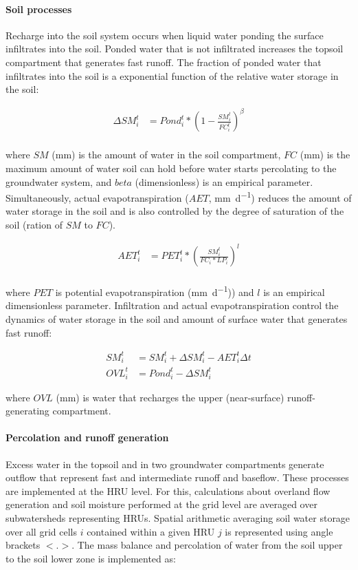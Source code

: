 \paragraph{Soil processes}  
Recharge into the soil system occurs when liquid water ponding the surface infiltrates into the soil. Ponded water that is not infiltrated increases the topsoil compartment that generates fast runoff. The fraction of ponded water that infiltrates into the soil is a exponential function of the relative water storage in the soil: 

\begin{align}
\Delta SM_i^t &= Pond_i^t * \left(1 - \frac{SM_i^t}{FC_i^t} \right)^\beta \\
\end{align} 

\noindent where $SM$ (\si{\milli\metre}) is the amount of water in the soil compartment, $FC$ (\si{\milli\metre}) is the maximum amount of water soil can hold before water starts percolating to the groundwater system, and $beta$ (dimensionless) is an empirical parameter. Simultaneously, actual evapotranspiration ($AET$, \si{\milli\metre\per\day}) reduces the amount of water storage in the soil and is also controlled by the degree of saturation of the soil (ration of $SM$ to $FC$). 

\begin{align}
AET_i^t &= PET_i^t * \left(\frac{SM_i^t}{FC_i * LP_i} \right)^l	 \\
\end{align} 

\noindent where $PET$ is potential evapotranspiration (\si{\milli\metre\per\day})) and $l$ is an empirical dimensionless parameter. Infiltration and actual evapotranspiration control the dynamics of water storage in the soil and amount of surface water that generates fast runoff:

\begin{align}
SM_i^t &= SM_i^{t} + \Delta SM_i^t - AET_i^t \Delta t\\
OVL_i^t &= Pond_i^t - \Delta SM_i^t
\end{align}

\noindent where $OVL$ (\si{\milli\metre}) is water that recharges the upper (near-surface) runoff-generating compartment.

\paragraph{Percolation and runoff generation}
Excess water in the topsoil and in two groundwater compartments generate outflow that represent fast and intermediate runoff and baseflow. These processes are implemented at the HRU level. For this, calculations about overland flow generation and soil moisture performed at the grid level are averaged over subwatersheds representing HRUs. Spatial arithmetic averaging soil water storage over all grid cells $i$ contained within a given HRU $j$ is represented using angle brackets $<.>$. The mass balance and percolation of water from the soil upper to the soil lower zone is implemented as:

